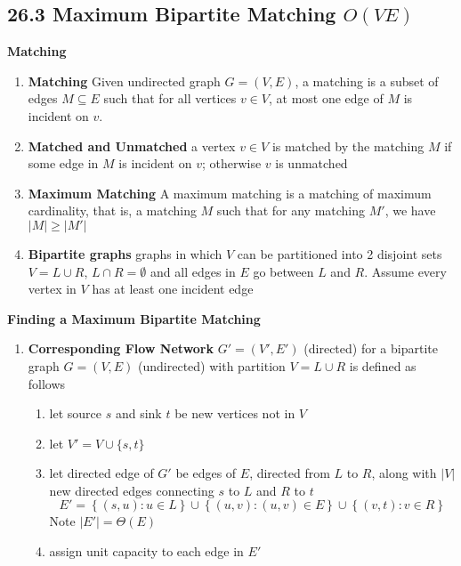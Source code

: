\documentclass[11pt]{article}
\begin{document}
\subsection*{26.3 Maximum Bipartite Matching $O(VE)$}

\begin{defn*} \textbf{Matching}
    \begin{enumerate}
        \item \textbf{Matching} Given undirected graph $G = (V,E)$, a matching is a subset of edges $M\subseteq E$ such that for all vertices $v\in V$, at most one edge of $M$ is incident on $v$.
        \item \textbf{Matched and Unmatched} a vertex $v\in V$ is matched by the matching $M$ if some edge in $M$ is incident on $v$; otherwise $v$ is unmatched
        \item \textbf{Maximum Matching} A maximum matching is a matching of maximum cardinality, that is, a matching $M$ such that for any matching $M'$, we have $|M | \geq |M'|$
        \item \textbf{Bipartite graphs} graphs in which $V$ can be partitioned into 2 disjoint sets $V = L\cup R$, $L\cap R = \emptyset$ and all edges in $E$ go between $L$ and $R$. Assume every vertex in $V$ has at least one incident edge
    \end{enumerate}
\end{defn*}


\begin{defn*}
    \textbf{Finding a Maximum Bipartite Matching}
    \begin{enumerate}
        \item \textbf{Corresponding Flow Network} $G' = (V', E')$ (directed) for a bipartite graph $G = (V,E)$ (undirected) with partition $V = L \cup R$ is defined as follows 
        \begin{enumerate}
            \item let source $s$ and sink $t$ be new vertices not in $V$
            \item let $V' = V \cup \{ s, t\}$
            \item let directed edge of $G'$ be edges of $E$, directed from $L$ to $R$, along with $|V|$ new directed edges connecting $s$ to $L$ and $R$ to $t$
            \[
                E' = \left\{ (s,u): u\in L \right\} \cup  \left\{ (u,v):(u,v)\in E \right\} \cup \left\{ (v,t): v\in R \right\} 
            \]
            Note $|E'| = \Theta(E)$
            \item assign unit capacity to each edge in $E'$ 
        \end{enumerate}
        
    \end{enumerate}
\end{defn*}
\end{document}
